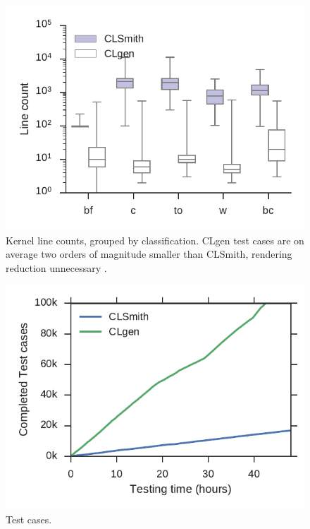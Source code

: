 \begin{figure}
	\centering %
	\includegraphics[width=\columnwidth]{build/img/kernel-sizes}%
	\caption{%
		Kernel line counts, grouped by classification. CLgen test cases are on average two orders of magnitude smaller than CLSmith, rendering reduction unnecessary .%
	}%
	\label{fig:kernel-sizes} %
\end{figure}


\begin{figure}
	\centering %
	\includegraphics[width=\columnwidth]{build/img/total-tests}%
	\caption{%
		Test cases. %
	}%
	\label{fig:total-tests} %
\end{figure}